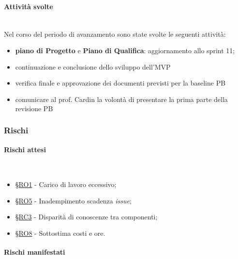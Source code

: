 \documentclass[10pt, letterpaper]{article}
\newcommand{\trisubsection}[1]{\paragraph{#1}\mbox{}\\}
\newcommand{\rif}[1]{\hyperref[#1]{§#1}}
\begin{document}
    \trisubsection{Attività svolte}
    Nel corso del periodo di avanzamento sono state svolte le seguenti attività:
    \begin{itemize}
        \item \textbf{piano di Progetto} e \textbf{Piano di Qualifica}: aggiornamento allo sprint 11;
        \item continuazione e conclusione dello sviluppo dell'MVP
        \item verifica finale e approvazione dei documenti previsti per la baseline PB
        \item comunicare al prof. Cardin la volontà di presentare la prima parte della revisione PB
    \end{itemize}

    \subsubsection{Rischi}
    \trisubsection{Rischi attesi}
   \begin{itemize}
    \item \rif{RO1} - Carico di lavoro eccessivo;
    \item \rif{RO5} - Inadempimento scadenza \textit{issue};
    \item \rif{RC3} - Disparità di conoscenze tra componenti;
    \item \rif{RO8} - Sottostima costi e ore.
\end{itemize}
    \trisubsection{Rischi manifestati}
\end{document}
